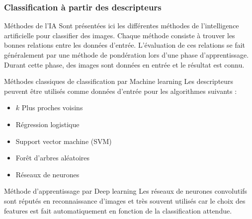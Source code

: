 \documentclass[8pt]{beamer}
\begin{document}
	\begin{frame}
		\frametitle{Classification à partir des descripteurs}
		\begin{block}{Méthodes de l'IA}
			Sont présentées ici les différentes méthodes de l'intelligence artificielle pour classifier des images. Chaque méthode consiste à trouver les bonnes relations entre les données d'entrée. L'évaluation de ces relations se fait généralement par une méthode de pondération lors d'une phase d'apprentissage. Durant cette phase, des images sont données en entrée et le résultat est connu.
		\end{block}
		\begin{block}{Méthodes classiques de classification par Machine learning}
			Les descripteurs peuvent être utilisés comme données d'entrée pour les algorithmes suivants :
			\begin{itemize}
				\item $k$ Plus proches voisins
				\item Régression logistique
				\item Support vector machine (SVM)
				\item Forêt d'arbres aléatoires
				\item Réseaux de neurones
			\end{itemize}
		\end{block}
		\begin{block}{Méthode d'apprentissage par Deep learning}
			Les réseaux de neurones convolutifs sont réputés en reconnaissance d'images et très souvent utilisés car le choix des features est fait automatiquement en fonction de la classification attendue.
		\end{block}
	\end{frame}
\end{document}
